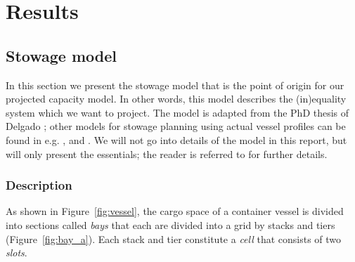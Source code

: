 \section{Results}\label{sec:results}
\subsection{Stowage model}
In this section we present the stowage model that is the point of origin for our projected capacity model. In other words, this model describes the (in)equality system which we want to project. The model is adapted from the PhD thesis of Delgado \cite{AlbertosThesis}; other models for stowage planning using actual vessel profiles can be found in e.g. \cite{DariosThesis}, \cite{pacino11} and \cite{pacino12}. We will not go into details of the model in this report, but will only present the essentials; the reader is referred to \cite{AlbertosThesis} %
for further details. 
%
\subsubsection*{Description}
As shown in Figure~\ref{fig:vessel}, the cargo space of a container vessel is divided into
sections called \textit{bays} that each are divided into a grid by stacks and tiers (Figure~\ref{fig:bay_a}). Each stack and tier constitute a \emph{cell} that consists of two \emph{slots}. 

